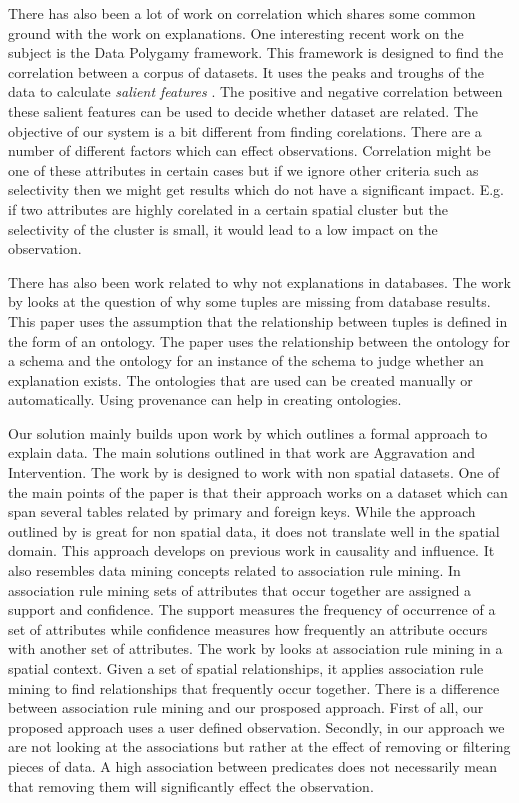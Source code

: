 There has also been a lot of work on correlation which shares some common ground with the work on explanations. One interesting recent work on the subject is the Data Polygamy framework\citep{chirigati2016data}. This framework is designed to find the correlation between a corpus of datasets. It uses the peaks and troughs of the data to calculate \textit{salient features} \citep{dunn1986applied}. The positive and negative correlation between these salient features can be used to decide whether dataset are related\citep{su2014supporting}. The objective of our system is a bit different from finding corelations. There are a number of different factors which can effect observations. Correlation might be one of these attributes in certain cases but if we ignore other criteria such as selectivity then we might get results which do not have a significant impact. E.g. if two attributes are highly corelated in a certain spatial cluster but the selectivity of the cluster is small, it would lead to a low impact on the observation.

There has also been work related to why not explanations in databases. The work by \citep{ten2015high} looks at the question of why some tuples are missing from database results. This paper uses the assumption that the relationship between tuples is defined in the form of an ontology. The paper uses the relationship between the ontology for a schema and the ontology for an instance of the schema to judge whether an explanation exists. The ontologies that are used can be created manually or automatically. Using provenance \citep{cheney2009provenance} can help in creating ontologies.

Our solution mainly builds upon work by \cite{roy2014formal} which outlines a formal approach to explain data. The main solutions outlined in that work are Aggravation and Intervention. The work by \cite{roy2014formal} is designed to work with non spatial datasets. One of the main points of the paper is that their approach works on a dataset which can span several tables related by primary and foreign keys. While the approach outlined by \cite{roy2014formal} is great for non spatial data, it does not translate well in the spatial domain. This approach develops on previous work in causality and influence. It also resembles data mining concepts related to association rule mining\citep{agarwal1994fast,tan2006introduction}. In association rule mining sets of attributes that occur together are assigned a support and confidence. The support measures the frequency of occurrence of a set of attributes while confidence measures how frequently an attribute occurs with another set of attributes. The work by \cite{koperski1995discovery} looks at association rule mining in a spatial context. Given a set of spatial relationships, it applies association rule mining to find relationships that frequently occur together. There is a difference between association rule mining and our prosposed approach. First of all, our proposed approach uses a user defined observation. Secondly, in our approach we are not looking at the associations but rather at the effect of removing or filtering pieces of data. A high association between predicates does not necessarily mean that removing them will significantly effect the observation.

